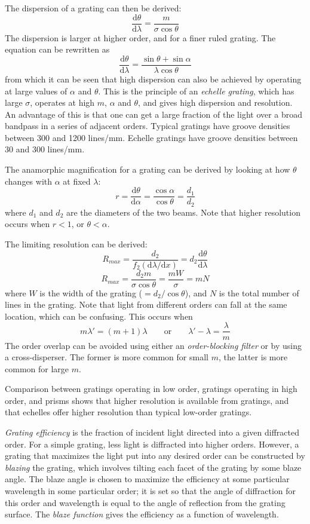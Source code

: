 \documentclass[12pt]{article}
\begin{document}
The dispersion of a grating can then be derived:
\[
    \frac{\mathrm{d}\theta}{\mathrm{d}\lambda} =
    \frac{m}{\sigma\cos\theta}
    \]
The dispersion is larger at higher order, and for a
finer ruled grating. The equation can be rewritten as
\[
    \frac{\mathrm{d}\theta}{\mathrm{d}\lambda} =
    \frac{\sin\theta + \sin\alpha}{\lambda\cos\theta}
    \]
from which it can be seen that high dispersion can also be achieved by
operating at large values of $\alpha$ and $\theta$. This is the principle of an
\textit{echelle grating}, which has large $\sigma$, operates at high $m$,
$\alpha$ and $\theta$, and gives high dispersion and resolution. An advantage
of this is that one can get a large fraction of the light over a broad bandpass
in a series of adjacent orders. Typical gratings have groove densities between
300 and 1200 lines/mm. Echelle gratings have groove densities between 30 and
300 lines/mm.

The anamorphic magnification for a grating can be derived by looking
at how $\theta$ changes with $\alpha$ at fixed $\lambda$:
\[
    r = \frac{\mathrm{d}\theta}{\mathrm{d}\alpha} =
    \frac{\cos\alpha}{\cos\theta} =
    \frac{d_{1}}{d_{2}}
    \]
where $d_{1}$ and $d_{2}$ are the diameters of the two beams.
Note that higher resolution occurs when $r < 1$, or $\theta < \alpha$.

The limiting resolution can be derived:
\[
    R_{max}
    = \frac{d_{2}}{f_{2}\left(\mathrm{d}\lambda/\mathrm{d}x\right)}
    = d_{2}\frac{\mathrm{d}\theta}{\mathrm{d}\lambda}
    \]
\[
    R_{max}
    = \frac{d_{2}m}{\sigma\cos\theta}
    = \frac{mW}{\sigma}
    = mN
    \]
where $W$ is the width of the grating ($=d_{2}/\cos\theta$), and $N$ is the
total number of lines in the grating. Note that light from different orders can
fall at the same location, which can be confusing. This occurs when
\[
    m\lambda' = (m + 1)\lambda
    \qquad \mathrm{or} \qquad
    \lambda' - \lambda = \frac{\lambda}{m}
    \]
The order overlap can be avoided using either an \textit{order-blocking filter}
or by using a cross-disperser. The former is more common for small $m$, the
latter is more common for large $m$.

Comparison between gratings operating in low order, gratings operating in high
order, and prisms shows that higher resolution is available from gratings, and
that echelles offer higher resolution than typical low-order gratings.

\textit{Grating efficiency} is the fraction of incident light directed into a
given diffracted order. For a simple grating, less light is diffracted into
higher orders. However, a grating that maximizes the light put into any desired
order can be constructed by \textit{blazing} the grating, which involves
tilting each facet of the grating by some blaze angle. The blaze angle is
chosen to maximize the efficiency at some particular wavelength in some
particular order; it is set so that the angle of diffraction for this order and
wavelength is equal to the angle of reflection from the grating surface. The
\textit{blaze function} gives the efficiency as a function of wavelength.
\end{document}
